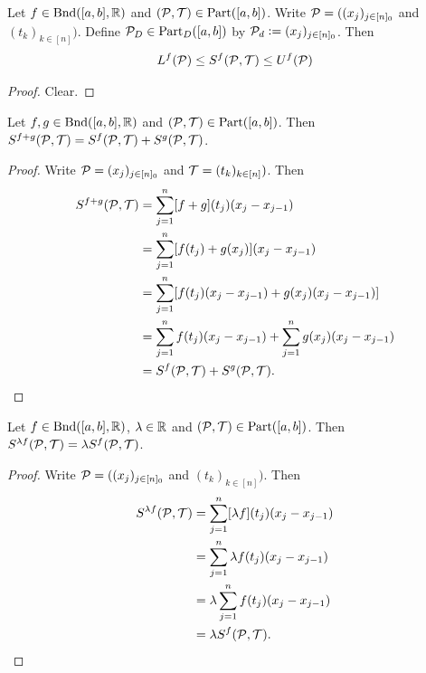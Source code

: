 \documentclass{book}
\begin{document}
	\begin{ex}  
		Let $f \in \text{Bnd}([a,b], \mathbb{R})$ and $(\mathcal{P}, \mathcal{T}) \in \text{Part}([a,b])$. Write $\mathcal{P} = ((x_j)_{j \in [n]_0}$ and $(t_k)_{k \in [n]})$. Define $\mathcal{P}_D \in \text{Part}_D([a,b])$ by $\mathcal{P}_d \vcentcolon= (x_j)_{j \in [n]_0}$. Then 
		$$L^f(\mathcal{P}) \leq S^f(\mathcal{P}, \mathcal{T}) \leq U^f(\mathcal{P})$$ 
	\end{ex}
	
	\begin{proof}
		Clear.
	\end{proof}
	
	\begin{ex}  
		Let $f, g \in \text{Bnd}([a,b], \mathbb{R})$ and $(\mathcal{P}, \mathcal{T}) \in \text{Part}([a,b])$. Then $S^{f+g}(\mathcal{P}, \mathcal{T}) = S^f(\mathcal{P}, \mathcal{T}) + S^g(\mathcal{P}, \mathcal{T})$.
	\end{ex}
	
	\begin{proof} 
		Write $\mathcal{P} = (x_j)_{j \in [n]_0}$ and $\mathcal{T} = (t_k)_{k \in [n]})$. Then 
		\begin{align*}
			S^{f+g}(\mathcal{P}, \mathcal{T})
			& = \sum\limits_{j=1}^n [f+g](t_j) (x_j - x_{j-1}) \\
			& = \sum\limits_{j=1}^n [f(t_j) + g(x_j)] (x_j - x_{j-1}) \\
			& = \sum\limits_{j=1}^n [f(t_j) (x_j - x_{j-1}) + g(x_j) (x_j - x_{j-1})] \\
			& = \sum\limits_{j=1}^n f(t_j) (x_j - x_{j-1}) +  \sum\limits_{j=1}^n g(x_j) (x_j - x_{j-1}) \\
			& = S^f(\mathcal{P}, \mathcal{T}) + S^g(\mathcal{P}, \mathcal{T}).
		\end{align*}
	\end{proof}
	
	\begin{ex}  
		Let $f \in \text{Bnd}([a,b], \mathbb{R})$, $\lambda \in \mathbb{R}$ and $(\mathcal{P}, \mathcal{T}) \in \text{Part}([a,b])$. Then $S^{\lambda f}(\mathcal{P}, \mathcal{T}) = \lambda S^f(\mathcal{P}, \mathcal{T})$.
	\end{ex}
	
	\begin{proof}
		Write $\mathcal{P} = ((x_j)_{j \in [n]_0}$ and $(t_k)_{k \in [n]})$. Then 
		\begin{align*}
			S^{\lambda f}(\mathcal{P}, \mathcal{T}) 
			& = \sum\limits_{j=1}^n [\lambda f](t_j) (x_j - x_{j-1}) \\
			& = \sum\limits_{j=1}^n \lambda f(t_j) (x_j - x_{j-1}) \\
			& = \lambda \sum\limits_{j=1}^n f(t_j) (x_j - x_{j-1}) \\
			& = \lambda S^f(\mathcal{P}, \mathcal{T}).
		\end{align*}
	\end{proof}
	
\end{document}
